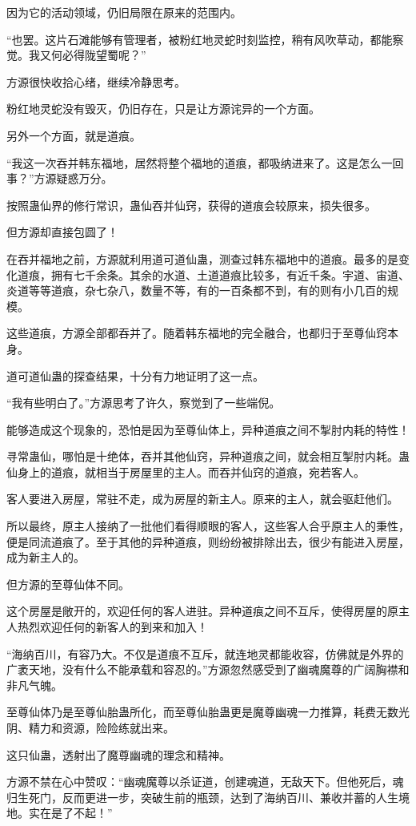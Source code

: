 \begin{this_body}
因为它的活动领域，仍旧局限在原来的范围内。

“也罢。这片石滩能够有管理者，被粉红地灵蛇时刻监控，稍有风吹草动，都能察觉。我又何必得陇望蜀呢？”

方源很快收拾心绪，继续冷静思考。

粉红地灵蛇没有毁灭，仍旧存在，只是让方源诧异的一个方面。

另外一个方面，就是道痕。

“我这一次吞并韩东福地，居然将整个福地的道痕，都吸纳进来了。这是怎么一回事？”方源疑惑万分。

按照蛊仙界的修行常识，蛊仙吞并仙窍，获得的道痕会较原来，损失很多。

但方源却直接包圆了！

在吞并福地之前，方源就利用道可道仙蛊，测查过韩东福地中的道痕。最多的是变化道痕，拥有七千余条。其余的水道、土道道痕比较多，有近千条。宇道、宙道、炎道等等道痕，杂七杂八，数量不等，有的一百条都不到，有的则有小几百的规模。

这些道痕，方源全部都吞并了。随着韩东福地的完全融合，也都归于至尊仙窍本身。

道可道仙蛊的探查结果，十分有力地证明了这一点。

“我有些明白了。”方源思考了许久，察觉到了一些端倪。

能够造成这个现象的，恐怕是因为至尊仙体上，异种道痕之间不掣肘内耗的特性！

寻常蛊仙，哪怕是十绝体，吞并其他仙窍，异种道痕之间，就会相互掣肘内耗。蛊仙身上的道痕，就相当于房屋里的主人。而吞并仙窍的道痕，宛若客人。

客人要进入房屋，常驻不走，成为房屋的新主人。原来的主人，就会驱赶他们。

所以最终，原主人接纳了一批他们看得顺眼的客人，这些客人合乎原主人的秉性，便是同流道痕了。至于其他的异种道痕，则纷纷被排除出去，很少有能进入房屋，成为新主人的。

但方源的至尊仙体不同。

这个房屋是敞开的，欢迎任何的客人进驻。异种道痕之间不互斥，使得房屋的原主人热烈欢迎任何的新客人的到来和加入！

“海纳百川，有容乃大。不仅是道痕不互斥，就连地灵都能收容，仿佛就是外界的广袤天地，没有什么不能承载和容忍的。”方源忽然感受到了幽魂魔尊的广阔胸襟和非凡气魄。

至尊仙体乃是至尊仙胎蛊所化，而至尊仙胎蛊更是魔尊幽魂一力推算，耗费无数光阴、精力和资源，险险练就出来。

这只仙蛊，透射出了魔尊幽魂的理念和精神。

方源不禁在心中赞叹：“幽魂魔尊以杀证道，创建魂道，无敌天下。但他死后，魂归生死门，反而更进一步，突破生前的瓶颈，达到了海纳百川、兼收并蓄的人生境地。实在是了不起！”


\end{this_body}

